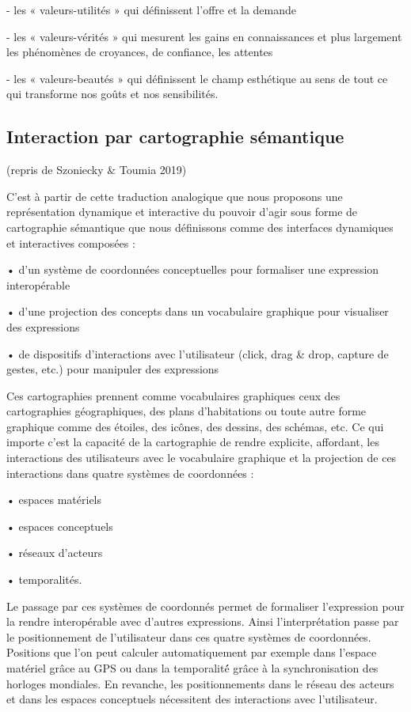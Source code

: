 \documentclass[
  letterpaper,
  DIV=11,
  numbers=noendperiod]{scrreprt}
\begin{document}
- les « valeurs-utilités » qui définissent l'offre et la demande

- les « valeurs-vérités » qui mesurent les gains en connaissances et
plus largement les phénomènes de croyances, de confiance, les attentes

- les « valeurs-beautés » qui définissent le champ esthétique au sens de
tout ce qui transforme nos goûts et nos sensibilités.

\hypertarget{sec-cartoSemantique}{%
\subsection{Interaction par cartographie
sémantique}\label{sec-cartoSemantique}}

(repris de Szoniecky \& Toumia 2019)

C'est à partir de cette traduction analogique que nous proposons une
représentation dynamique et interactive du pouvoir d'agir sous forme de
cartographie sémantique que nous définissons comme des interfaces
dynamiques et interactives composées :

• d'un système de coordonnées conceptuelles pour formaliser une
expression interopérable

• d'une projection des concepts dans un vocabulaire graphique pour
visualiser des expressions

• de dispositifs d'interactions avec l'utilisateur (click, drag \& drop,
capture de gestes, etc.) pour manipuler des expressions

Ces cartographies prennent comme vocabulaires graphiques ceux des
cartographies géographiques, des plans d'habitations ou toute autre
forme graphique comme des étoiles, des icônes, des dessins, des schémas,
etc. Ce qui importe c'est la capacité de la cartographie de rendre
explicite, affordant, les interactions des utilisateurs avec le
vocabulaire graphique et la projection de ces interactions dans quatre
systèmes de coordonnées :

• espaces matériels

• espaces conceptuels

• réseaux d'acteurs

• temporalités.

Le passage par ces systèmes de coordonnés permet de formaliser
l'expression pour la rendre interopérable avec d'autres expressions.
Ainsi l'interprétation passe par le positionnement de l'utilisateur dans
ces quatre systèmes de coordonnées. Positions que l'on peut calculer
automatiquement par exemple dans l'espace matériel grâce au GPS ou dans
la temporalité́ grâce à la synchronisation des horloges mondiales. En
revanche, les positionnements dans le réseau des acteurs et dans les
espaces conceptuels nécessitent des interactions avec l'utilisateur.
\end{document}
